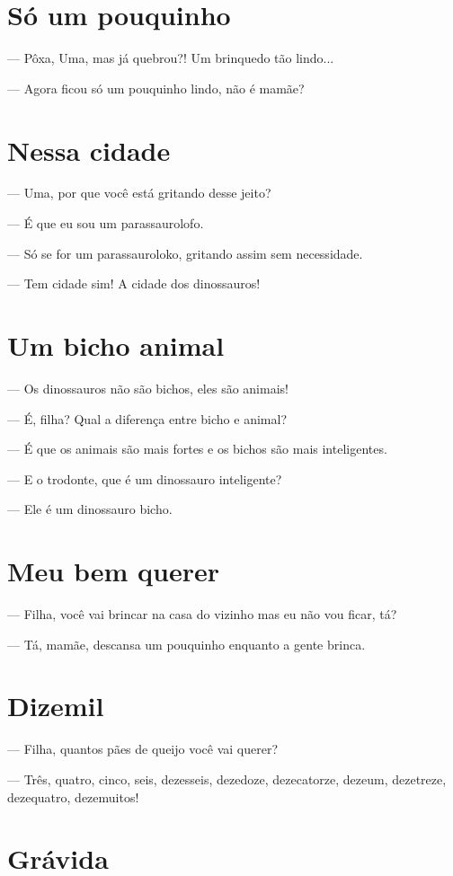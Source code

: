 \chapter{Só um pouquinho}

— Pôxa, Uma, mas já quebrou?! Um brinquedo tão lindo...

— Agora ficou só um pouquinho lindo, não é mamãe?

\chapter{Nessa cidade}

— Uma, por que você está gritando desse jeito?

— É que eu sou um parassaurolofo.

— Só se for um parassauroloko, gritando assim sem necessidade.

— Tem cidade sim! A cidade dos dinossauros!

\chapter{Um bicho animal}

— Os dinossauros não são bichos, eles são animais!

— É, filha? Qual a diferença entre bicho e animal?

— É que os animais são mais fortes e os bichos são mais inteligentes.

— E o trodonte, que é um dinossauro inteligente?

— Ele é um dinossauro bicho.

\chapter{Meu bem querer}

— Filha, você vai brincar na casa do vizinho mas eu não vou ficar, tá?

— Tá, mamãe, descansa um pouquinho enquanto a gente brinca.

\chapter{Dizemil}

— Filha, quantos pães de queijo você vai querer?

— Três, quatro, cinco, seis, dezesseis, dezedoze, dezecatorze, dezeum,
dezetreze, dezequatro, dezemuitos!

\chapter{Grávida}

